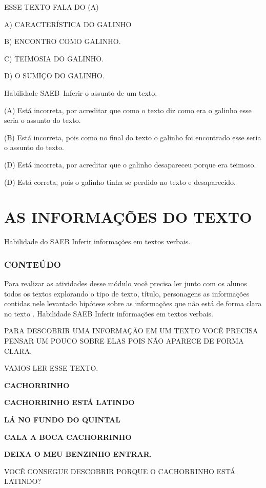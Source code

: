 \begin{escola}
ESSE TEXTO FALA DO (A)

A) CARACTERÍSTICA DO GALINHO

B) ENCONTRO COMO GALINHO.

C) TEIMOSIA DO GALINHO.

D) O SUMIÇO DO GALINHO.

Habilidade SAEB~Inferir o assunto de um texto.

(A) Está incorreta, por acreditar que como o texto diz como era o
galinho esse seria o assunto do texto.

(B) Está incorreta, pois como no final do texto o galinho foi encontrado
esse seria o assunto do texto.

(D) Está incorreta, por acreditar que o galinho desapareceu porque era
teimoso.

(D) Está correta, pois o galinho tinha se perdido no texto e
desaparecido.

\chapter{AS INFORMAÇÕES DO TEXTO}

\protect\hypertarget{_heading=h.1pxezwc}{}{}Habilidade do SAEB
Inferir informações em textos verbais.

\subsection{CONTEÚDO}\label{conteuxfado-5}

Para realizar as atividades desse módulo você precisa ler junto com os
alunos todos os textos explorando o tipo de texto, título, personagens
as informações contidas nele levantado hipótese sobre as informações que
não está de forma clara no texto . Habilidade SAEB Inferir informações
em textos verbais.

PARA DESCOBRIR UMA INFORMAÇÃO EM UM TEXTO VOCÊ PRECISA PENSAR UM POUCO
SOBRE ELAS POIS NÃO APARECE DE FORMA CLARA.

VAMOS LER ESSE TEXTO.

\textbf{CACHORRINHO}

\textbf{CACHORRINHO ESTÁ LATINDO}

\textbf{LÁ NO FUNDO DO QUINTAL}

\textbf{CALA A BOCA CACHORRINHO}

\textbf{DEIXA O MEU BENZINHO ENTRAR.}

VOCÊ CONSEGUE DESCOBRIR PORQUE O CACHORRINHO ESTÁ LATINDO?


\end{escola}

